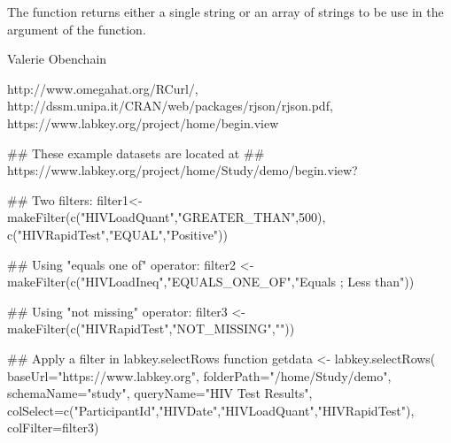 \begin{Value}
The function returns either a single string or an array of strings to be use in the
 argument of the  function.
\end{Value}
\begin{Author}\relax
Valerie Obenchain
\end{Author}
\begin{References}\relax
http://www.omegahat.org/RCurl/, \\
http://dssm.unipa.it/CRAN/web/packages/rjson/rjson.pdf,\\
https://www.labkey.org/project/home/begin.view
\end{References}
\begin{SeeAlso}\relax
{}
\end{SeeAlso}
\begin{Examples}
\begin{ExampleCode}
## These example datasets are located at 
## https://www.labkey.org/project/home/Study/demo/begin.view?

## Two filters:
filter1<- makeFilter(c("HIVLoadQuant","GREATER_THAN",500), 
c("HIVRapidTest","EQUAL","Positive"))

## Using "equals one of" operator:
filter2 <- makeFilter(c("HIVLoadIneq","EQUALS_ONE_OF","Equals ; Less than"))

## Using "not missing" operator:
filter3 <- makeFilter(c("HIVRapidTest","NOT_MISSING","")) 

## Apply a filter in labkey.selectRows function
getdata <- labkey.selectRows(
baseUrl="https://www.labkey.org", 
folderPath="/home/Study/demo", 
schemaName="study", 
queryName="HIV Test Results", 
colSelect=c("ParticipantId","HIVDate","HIVLoadQuant","HIVRapidTest"), 
colFilter=filter3)


\end{ExampleCode}
\end{Examples}


